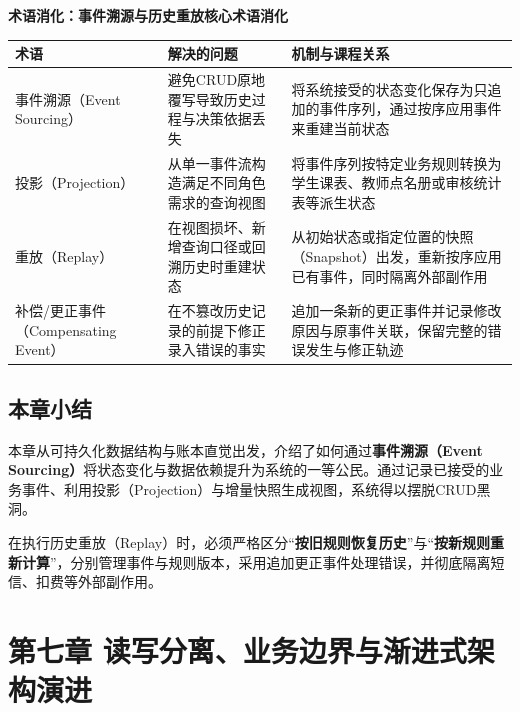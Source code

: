 \documentclass[UTF8,a4paper,11pt,fontset=fandol]{ctexart}
\begin{document}
\par{}\textbf{术语消化：事件溯源与历史重放核心术语消化}

\begin{center}\small\begin{tabularx}{\linewidth}{YYY}

\toprule

术语 & 解决的问题 & 机制与课程关系\\\midrule

事件溯源（Event Sourcing） & 避免CRUD原地覆写导致历史过程与决策依据丢失 & 将系统接受的状态变化保存为只追加的事件序列，通过按序应用事件来重建当前状态\\[3pt]

投影（Projection） & 从单一事件流构造满足不同角色需求的查询视图 & 将事件序列按特定业务规则转换为学生课表、教师点名册或审核统计表等派生状态\\[3pt]

重放（Replay） & 在视图损坏、新增查询口径或回溯历史时重建状态 & 从初始状态或指定位置的快照（Snapshot）出发，重新按序应用已有事件，同时隔离外部副作用\\[3pt]

补偿/更正事件（Compensating Event） & 在不篡改历史记录的前提下修正录入错误的事实 & 追加一条新的更正事件并记录修改原因与原事件关联，保留完整的错误发生与修正轨迹\\[3pt]

\bottomrule\end{tabularx}\end{center}

\subsection{本章小结}

本章从可持久化数据结构与账本直觉出发，介绍了如何通过\textbf{事件溯源（Event Sourcing）}将状态变化与数据依赖提升为系统的一等公民。通过记录已接受的业务事件、利用投影（Projection）与增量快照生成视图，系统得以摆脱CRUD黑洞。

在执行历史重放（Replay）时，必须严格区分“\textbf{按旧规则恢复历史}”与“\textbf{按新规则重新计算}”，分别管理事件与规则版本，采用追加更正事件处理错误，并彻底隔离短信、扣费等外部副作用。

\section{第七章 读写分离、业务边界与渐进式架构演进}
\end{document}
